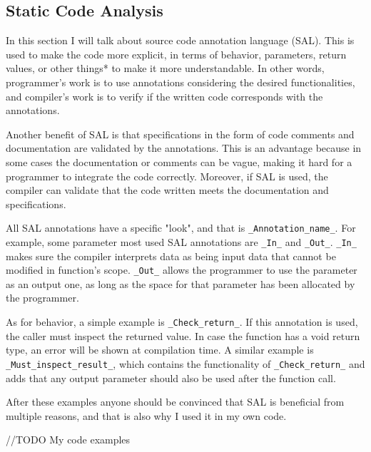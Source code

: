 		\subsection{Static Code Analysis}
		In this section I will talk about source code annotation language (SAL). This is used to make the code more explicit, in terms of behavior, parameters, return values, or other things* to make it more understandable. In other words, programmer's work is to use annotations considering the desired functionalities, and compiler's work is to verify if the written code corresponds with the annotations. 
		
		Another benefit of SAL is that specifications in the form of code comments and documentation are validated by the annotations. This is an advantage because in some cases the documentation or comments can be vague, making it hard for a programmer to integrate the code correctly. Moreover, if SAL is used, the compiler can validate that the code written meets the documentation and specifications.
		
		All SAL annotations have a specific "look", and that is \texttt{\_Annotation\_name\_}. For example, some parameter most used SAL annotations are \texttt{\_In\_} and \texttt{\_Out\_}. \texttt{\_In\_} makes sure the compiler interprets data as being input data that cannot be modified in function's scope. \texttt{\_Out\_} allows the programmer to use the parameter as an output one, as long as the space for that parameter has been allocated by the programmer.
		
		As for behavior, a simple example is \texttt{\_Check\_return\_}. If this annotation is used, the caller must inspect the returned value. In case the function has a void return type, an error will be shown at compilation time. A similar example is \texttt{\_Must\_inspect\_result\_}, which contains the functionality of \texttt{\_Check\_return\_} and adds that any output parameter should also be used after the function call.
		
		After these examples anyone should be convinced that SAL is beneficial from multiple reasons, and that is also why I used it in my own code.
		
		//TODO
		My code examples
		